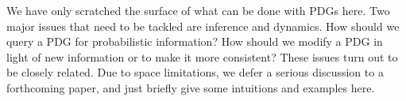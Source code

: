 \documentclass[letterpaper]{article} %
\theoremstyle{plain}
\theoremstyle{definition}
\theoremstyle{remark}
\begin{document}

We have only scratched the surface of what can be done with PDGs here.
Two major issues that need to be tackled are inference and dynamics.
How should we query a PDG for probabilistic information? How should 
we modify a PDG in light of new information or to make it more consistent?
These issues turn out to be closely related.
Due to space limitations, 
we defer a serious discussion to a forthcoming paper,
and just briefly give some intuitions and examples here.
\end{document}
